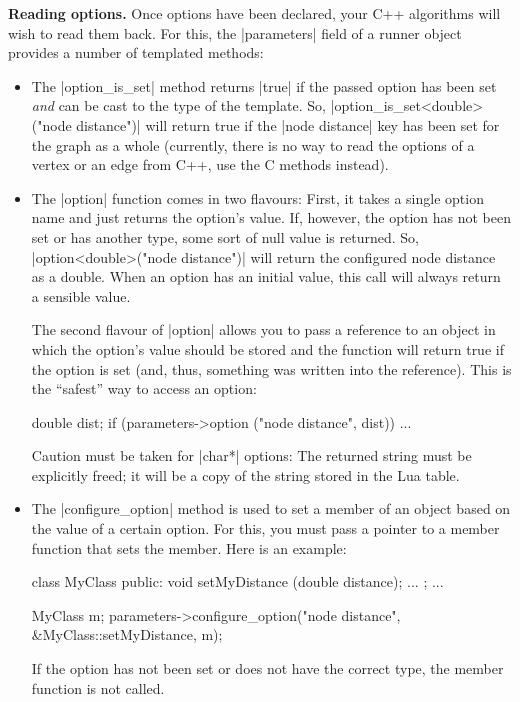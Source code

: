 \medskip
\noindent\textbf{Reading options.}
Once options have been declared, your C++ algorithms will wish to read
them back. For this, the |parameters| field of a runner object
provides a number of templated methods:
\begin{itemize}
\item The |option_is_set| method returns |true| if the passed option
  has been set \emph{and} can be cast to the type of the template. So,
  |option_is_set<double>("node distance")| will return true if the
  |node distance| key has been set for the graph as a whole
  (currently, there is no way to read the options of a vertex or an
  edge from C++, use the C methods instead).
\item The |option| function comes in two flavours: First, it takes a
  single option name and just returns the option's value. If, however,
  the option has not been set or has another type, some sort of null
  value is returned. So, |option<double>("node distance")| will return
  the configured node distance as a double. When an option has an
  initial value, this call will always return a sensible value.

  The second flavour of |option| allows you to pass a reference to an
  object in which the option's value should be stored and the function
  will return true if the option is set (and, thus, something was
  written into the reference). This is the ``safest'' way to access
  an option:
\begin{codeexample}
double dist;
if (parameters->option ("node distance", dist))
  ...
\end{codeexample}  
  
  Caution must be taken for |char*| options: The returned string must
  be explicitly freed; it will be a copy of the string stored in the
  Lua table.
\item
  The |configure_option| method is used to set a member of an object
  based on the value of a certain option. For this, you must pass a
  pointer to a member function that sets the member. Here is an
  example:
\begin{codeexample}
class MyClass {
public:
  void setMyDistance (double distance);
...
};
...

MyClass m;
parameters->configure_option("node distance", &MyClass::setMyDistance, m);
\end{codeexample}
  If the option has not been set or does not have the correct type,
  the member function is not called.
\end{itemize}


